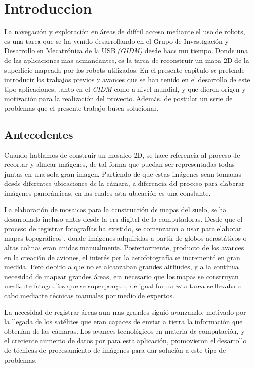
\chapter{Introduccion}
\label{capitulo1}

La navegación y exploración en áreas de difícil acceso mediante el uso de robots, es una tarea que se ha venido desarrollando en el Grupo de Investigación y Desarrollo en Mecatrónica de la USB  \textit{(GIDM)} desde hace mu tiempo. Donde una de las aplicaciones mas demandantes, es la tarea de reconstruir un mapa 2D de la superficie mapeada por los robots utilizados. En el presente capitulo se pretende introducir los trabajos previos y avances que se han tenido en el desarrollo de este tipo aplicaciones, tanto en el \textit{GIDM} como a nivel mundial, y que dieron origen y motivación para la realización del proyecto. Además, de postular un serie de problemas que el presente trabajo busca solucionar.

\section{Antecedentes}

Cuando hablamos de construir un mosaico 2D, se hace referencia al proceso de recortar y alinear imágenes, de tal forma que puedan ser representadas todas juntas en una sola gran imagen. Partiendo de que estas imágenes sean tomadas desde diferentes ubicaciones de la cámara, a diferencia del proceso para elaborar imágenes panorámicas, en las cuales esta ubicación es una constante. 

La elaboración de mosaicos para la construcción de mapas del suelo, se ha desarrollado incluso antes desde la era digital de la computadoras. Desde que el proceso de registrar fotografías ha existido, se comenzaron a usar para elaborar mapas topográficos \cite{primeros-mapas}, donde imágenes adquiridas a partir de globos aerostáticos o altas colinas eran unidas manualmente. Posteriormente, producto de los avances en la creación de aviones, el interés por la aerofotografía se incrementó en gran medida. Pero debido a que no se alcanzaban grandes altitudes, y a la continua necesidad de mapear grandes áreas, era necesario que los mapas se construyan mediante fotografías que se superpongan, de igual forma esta tarea se llevaba a cabo mediante técnicas manuales por medio de expertos.

La necesidad de registrar áreas aun mas grandes siguió avanzando, motivado por la llegada de los satélites que eran capaces de enviar a tierra la información que obtenían de las cámaras. Los avances tecnológicos en materia de computación, y el creciente aumento de datos por para esta aplicación, promovieron el desarrollo de técnicas de procesamiento de imágenes para dar solución a este tipo de problemas.

